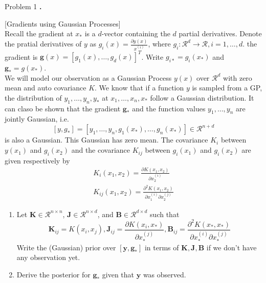 \documentclass{article}
\newcounter{pcounter}                                   %
\newenvironment{problem}                                %
{                                                       %
    \color{gray}                                        %
    \stepcounter{pcounter}                              %
    \textbf{\arabic{pcounter}.}                         %
}{}                                                     %
\newcommand{\domR}{\mathcal{R}}                         %
\renewcommand{\vec}[1]{\mathbf{#1}}                     %
\begin{document}
\begin{section}{Problem 1}
        \begin{problem}
            [Gradients using Gaussian Processes] \\
            Recall the gradient at $x_*$ is a $d$-vector containing the $d$ partial derivatives. Denote the pratial derivatives of $y$ as $g_i(x) = \frac{\partial y(x)}{x^{(i)}}$, where $g_i : \domR^{d} \to \domR, i=1, \dots, d$. the gradient is $\vec{g}(x) = [g_1(x), \dots, g_d(x)]^T$. Write $g_{i*} = g_i(x_*)$ and $\vec{g}_* = g(x_*)$. \\
            We will model our observation as a Gaussian Process $y(x)$ over $\domR^d$ with zero mean and auto covariance $K$. We know that if a function $y$ is sampled from a GP, the distribution of $y_1, \dots, y_n, y_*$ at $x_1, \dots, x_n, x_*$ follow a Gaussian distribution. It can claso be shown that the gradient $\vec{g}_*$ and the function values $y_1, \dots, y_n$ are jointly Gaussian, i.e.
            $$
                [y, g_*] = [y_1, \dots, y_n, g_1(x_*), \dots, g_n(x_*)] \in \domR^{n+d}
            $$
            is also a Gaussian. This Gaussian has zero mean. The covariance $K_i$ between $y(x_1)$ and $g_i(x_2)$ and the covariance $K_{ij}$ between $g_i(x_1)$ and $g_i(x_2)$ are given respectively by
            \begin{gather*}
                K_i(x_1, x_2) = \frac{\partial K(x_1, x_2)}{\partial x_2^{(i)}}
                \\
                K_{ij} (x_1, x_2) = \frac{\partial^2 K(x_1, x_2)}
                                        {\partial{x_1^{(i)}} \partial{x_2^{(j)}}}
            \end{gather*}
            \begin{enumerate}[label=\alph*)]
                \item Let $\vec{K} \in \domR^{n \times n}$, $\vec{J} \in \domR^{n \times d}$, and $\vec{B} \in \domR^{d \times d}$ such that
                $$
                    \vec{K}_{ij} = K(x_i, x_j),
                    \vec{J}_{ij} = \frac{\partial K(x_i, x_*)}{\partial x_*^{(j)}},
                    \vec{B}_{ij} = \frac{\partial^2 K(x_*, x_*)}{\partial x_*^{(i)} \partial x_*^{(j)}}
                $$
                Write the (Gaussian) prior over $[\vec{y}, \vec{g}_*]$ in terms of $\vec{K, J, B}$ if we don't have any observation yet.

                \item Derive the posterior for $\vec{g_*}$ given that $\vec{y}$ was observed.
                

\end{enumerate}
\end{problem}
\end{section}
\end{document}
